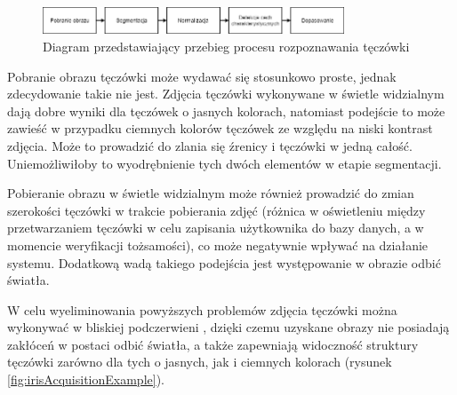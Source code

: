 \begin{figure}[ht]
  \centering
  \includegraphics[width=0.8\textwidth]{images/intro/processDiagram.png}
  \caption{Diagram przedstawiający przebieg procesu rozpoznawania tęczówki}
  \label{fig:processDiagram}
\end{figure}

Pobranie obrazu tęczówki może wydawa\'c się stosunkowo proste, jednak zdecydowanie takie nie
jest. Zdjęcia tęczówki wykonywane w świetle widzialnym dają dobre wyniki dla tęczówek o jasnych
kolorach, natomiast podejście to może zawieś\'c w przypadku ciemnych kolorów tęczówek ze względu
na niski kontrast zdjęcia. Może to prowadzi\'c do zlania się \'zrenicy i tęczówki w jedną całoś\'c.
Uniemożliwiłoby to wyodrębnienie tych dwóch elementów w etapie segmentacji.

Pobieranie obrazu w świetle widzialnym może również prowadzi\'c do zmian szerokości tęczówki w trakcie
pobierania zdję\'c (różnica w oświetleniu między przetwarzaniem tęczówki w celu zapisania użytkownika
do bazy danych, a w momencie weryfikacji tożsamości), co może negatywnie wpływa\'c na działanie
systemu. Dodatkową wadą takiego podejścia jest występowanie w obrazie odbi\'c światła.

W celu wyeliminowania powyższych problemów zdjęcia tęczówki można wykonywa\'c w bliskiej podczerwieni \cite{IrisRecognitionPresentation},
dzięki czemu uzyskane obrazy nie posiadają zakłóceń w postaci odbi\'c światła, a także
zapewniają widocznoś\'c struktury tęczówki zarówno dla tych o jasnych, jak i ciemnych kolorach (rysunek \ref{fig:irisAcquisitionExample}).

